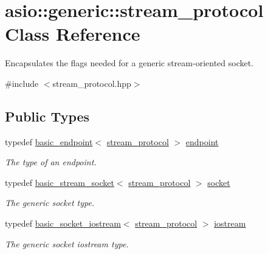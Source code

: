 \hypertarget{classasio_1_1generic_1_1stream__protocol}{}\section{asio\+:\+:generic\+:\+:stream\+\_\+protocol Class Reference}
\label{classasio_1_1generic_1_1stream__protocol}


Encapsulates the flags needed for a generic stream-\/oriented socket.  




{\ttfamily \#include $<$stream\+\_\+protocol.\+hpp$>$}

\subsection*{Public Types}
\begin{DoxyCompactItemize}
\item 
typedef \hyperlink{classasio_1_1generic_1_1basic__endpoint}{basic\+\_\+endpoint}$<$ \hyperlink{classasio_1_1generic_1_1stream__protocol}{stream\+\_\+protocol} $>$ \hyperlink{classasio_1_1generic_1_1stream__protocol_a2217db3a8791fa9c28a340b877d2ef0f}{endpoint}
\begin{DoxyCompactList}\small\item\em The type of an endpoint. \end{DoxyCompactList}\item 
typedef \hyperlink{classasio_1_1basic__stream__socket}{basic\+\_\+stream\+\_\+socket}$<$ \hyperlink{classasio_1_1generic_1_1stream__protocol}{stream\+\_\+protocol} $>$ \hyperlink{classasio_1_1generic_1_1stream__protocol_abff2e68a3458693a14e871b1f94a850c}{socket}
\begin{DoxyCompactList}\small\item\em The generic socket type. \end{DoxyCompactList}\item 
typedef \hyperlink{classasio_1_1basic__socket__iostream}{basic\+\_\+socket\+\_\+iostream}$<$ \hyperlink{classasio_1_1generic_1_1stream__protocol}{stream\+\_\+protocol} $>$ \hyperlink{classasio_1_1generic_1_1stream__protocol_a8c47df8acd5a63bd939cef41beaf202d}{iostream}
\begin{DoxyCompactList}\small\item\em The generic socket iostream type. \end{DoxyCompactList}\end{DoxyCompactItemize}
